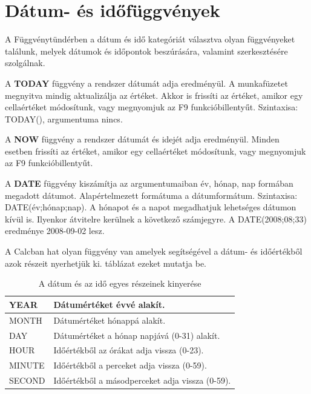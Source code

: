 \chapter{Dátum- és időfüggvények}
\thispagestyle{empty}

A Függvénytündérben a dátum és idő kategóriát
választva olyan függvényeket találunk, melyek dátumok és
időpontok beszúrására, valamint szerkesztésére
szolgálnak. 

A \textbf{TODAY} függvény a rendszer dátumát adja
eredményül. A munkafüzetet megnyitva mindig aktualizálja az
értéket. Akkor is frissíti az értéket, amikor egy
cellaértéket módosítunk, vagy megnyomjuk az F9
funkcióbillentyűt. Szintaxisa: TODAY(), argumentuma nincs.

A \textbf{NOW} függvény a rendszer dátumát és idejét adja
eredményül. Minden esetben frissíti az értéket, amikor egy
cellaértéket módosítunk, vagy megnyomjuk az F9
funkcióbillentyűt.

A \textbf{DATE} függvény kiszámítja az argumentumaiban év,
hónap, nap formában megadott dátumot. Alapértelmezett
formátuma a dátumformátum. Szintaxisa: DATE(év;hónap;nap). A
hónapot és a  napot megadhatjuk lehetséges dátumon kívül
is. Ilyenkor átvitelre kerülnek a következő számjegyre. A
DATE(2008;08;33) eredménye 2008-09-02 lesz.

A Calcban hat olyan függvény van amelyek segítségével a
dátum- és időértékből azok részeit nyerhetjük ki. 
 táblázat ezeket mutatja be.

\begin{table}[!h]
\begin{center}
\caption{A dátum és az idő egyes részeinek kinyerése}\label{DateFüggvények}
\begin{tabular}{|m{2.5cm}|m{8cm}|}
\hline
YEAR &
Dátumértéket évvé alakít.\\ \hline
MONTH &
Dátumértéket hónappá alakít.\\ \hline
DAY &
Dátumértéket a hónap napjává (0-31) alakít.\\ \hline
HOUR &
Időértékből az órákat adja vissza (0-23).\\ \hline
MINUTE &
Időértékből a perceket adja vissza (0-59).\\ \hline
SECOND &
Időértékből a másodperceket adja vissza (0-59).\\ \hline
\end{tabular}
\end{center}
\end{table}

